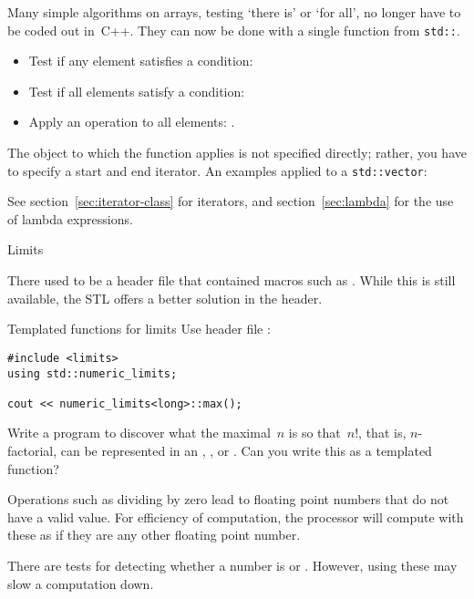 Many simple algorithms on arrays, testing `there is' or `for all', no
longer have to be coded out in~C++. They can now be done with a single
function from \lstinline{std::}.
\begin{itemize}
\item Test if any element satisfies a condition:
\item Test if all elements satisfy a condition:
\item Apply an operation to all elements: .
\end{itemize}

The object to which the function applies is not specified directly; 
rather, you have to specify a start
and end iterator. An examples applied to a 
\lstinline{std::vector}:
%

See section~\ref{sec:iterator-class} for iterators, and
section~\ref{sec:lambda} for the use of lambda expressions.

 {Limits}
\label{sec:limits}

There used to be a header file  that contained
macros such as . While this is still available,
the \ac{STL} offers a better solution in the
 header.

\begin{block}{Templated functions for limits}
  \label{sl:stl-limits}
  Use header file :
\begin{lstlisting}
#include <limits>
using std::numeric_limits;

cout << numeric_limits<long>::max();
\end{lstlisting}
\end{block}

\begin{exercise}
  \label{ex:big-factorial}
  Write a program to discover what the maximal~$n$ is so that~$n!$,
  that is, $n$-factorial, can be represented in an , ,
  or . Can you write this as a templated function?
\end{exercise}

Operations such as dividing by zero lead to floating point numbers
that do not have a valid value. For efficiency of computation, the
processor will compute with these as if they are any other floating
point number.

There are tests for detecting whether a number is  or
. However, using these may slow a computation down.

